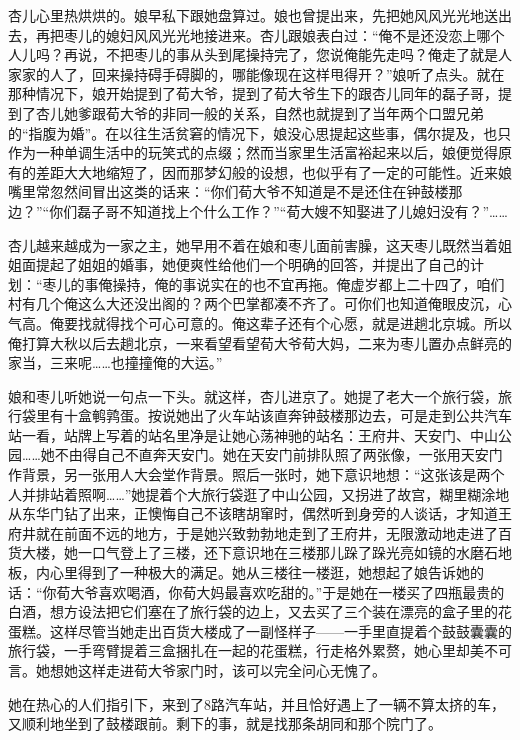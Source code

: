 \par 杏儿心里热烘烘的。娘早私下跟她盘算过。娘也曾提出来，先把她风风光光地送出去，再把枣儿的媳妇风风光光地接进来。杏儿跟娘表白过：“俺不是还没恋上哪个人儿吗？再说，不把枣儿的事从头到尾操持完了，您说俺能先走吗？俺走了就是人家家的人了，回来操持碍手碍脚的，哪能像现在这样甩得开？”娘听了点头。就在那种情况下，娘开始提到了荀大爷，提到了荀大爷生下的跟杏儿同年的磊子哥，提到了杏儿她爹跟荀大爷的非同一般的关系，自然也就提到了当年两个口盟兄弟的“指腹为婚”。在以往生活贫窘的情况下，娘没心思提起这些事，偶尔提及，也只作为一种单调生活中的玩笑式的点缀；然而当家里生活富裕起来以后，娘便觉得原有的差距大大地缩短了，因而那梦幻般的设想，也似乎有了一定的可能性。近来娘嘴里常忽然间冒出这类的话来：“你们荀大爷不知道是不是还住在钟鼓楼那边？”“你们磊子哥不知道找上个什么工作？”“荀大嫂不知娶进了儿媳妇没有？”……
\par 杏儿越来越成为一家之主，她早用不着在娘和枣儿面前害臊，这天枣儿既然当着姐姐面提起了姐姐的婚事，她便爽性给他们一个明确的回答，并提出了自己的计划：“枣儿的事俺操持，俺的事说实在的也不宜再拖。俺虚岁都上二十四了，咱们村有几个俺这么大还没出阁的？两个巴掌都凑不齐了。可你们也知道俺眼皮沉，心气高。俺要找就得找个可心可意的。俺这辈子还有个心愿，就是进趟北京城。所以俺打算大秋以后去趟北京，一来看望看望荀大爷荀大妈，二来为枣儿置办点鲜亮的家当，三来呢……也撞撞俺的大运。”
\par 娘和枣儿听她说一句点一下头。就这样，杏儿进京了。她提了老大一个旅行袋，旅行袋里有十盒鹌鹑蛋。按说她出了火车站该直奔钟鼓楼那边去，可是走到公共汽车站一看，站牌上写着的站名里净是让她心荡神驰的站名：王府井、天安门、中山公园……她不由得自己不直奔天安门。她在天安门前排队照了两张像，一张用天安门作背景，另一张用人大会堂作背景。照后一张时，她下意识地想：“这张该是两个人并排站着照啊……”她提着个大旅行袋逛了中山公园，又拐进了故宫，糊里糊涂地从东华门钻了出来，正懊悔自己不该瞎胡窜时，偶然听到身旁的人谈话，才知道王府井就在前面不远的地方，于是她兴致勃勃地走到了王府井，无限激动地走进了百货大楼，她一口气登上了三楼，还下意识地在三楼那儿跺了跺光亮如镜的水磨石地板，内心里得到了一种极大的满足。她从三楼往一楼逛，她想起了娘告诉她的话：“你荀大爷喜欢喝酒，你荀大妈最喜欢吃甜的。”于是她在一楼买了四瓶最贵的白酒，想方设法把它们塞在了旅行袋的边上，又去买了三个装在漂亮的盒子里的花蛋糕。这样尽管当她走出百货大楼成了一副怪样子——一手里直提着个鼓鼓囊囊的旅行袋，一手弯臂提着三盒捆扎在一起的花蛋糕，行走格外累赘，她心里却美不可言。她想她这样走进荀大爷家门时，该可以完全问心无愧了。
\par 她在热心的人们指引下，来到了8路汽车站，并且恰好遇上了一辆不算太挤的车，又顺利地坐到了鼓楼跟前。剩下的事，就是找那条胡同和那个院门了。
